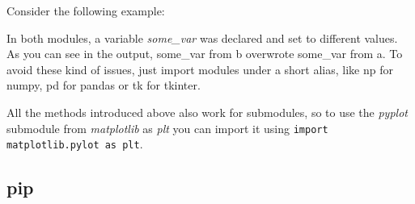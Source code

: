       Consider the following example:

      In both modules, a variable \textit{some\_var} was declared and set to different values.
      As you can see in the output, some\_var from b overwrote some\_var from a.
      To avoid these kind of issues, just import modules under a short alias, like
      np for numpy, pd for pandas or tk for tkinter.

      All the methods introduced above also work for submodules, so to use the \textit{pyplot}
      submodule from \textit{matplotlib} as \textit{plt} you can import it using
      \texttt{import matplotlib.pylot as plt}.

  \subsection{pip}